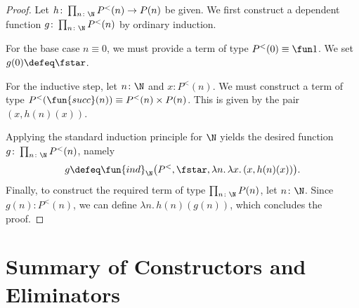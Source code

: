 \begin{proof}
    Let $h\colon\prod_{n\colon\N}P^<(n)\to P(n)$ be given. We first construct a dependent function $g\colon\prod_{n\colon\N}P^<(n)$ by ordinary induction.
    
    For the base case $n\equiv 0$, we must provide a term of type $P^<(0)\equiv\fun1$. We set $g(0)\defeq\fstar$.
    
    For the inductive step, let $n\colon\N$ and $x\colon P^<(n)$. We must construct a term of type $P^<(\fun{succ}(n))\equiv P^<(n)\times P(n)$. This is given by the pair $(x,h(n)(x))$. 
    
    Applying the standard induction principle for $\N$ yields the desired function $g\colon\prod_{n\colon\N} P^{<}(n)$, namely 
    \[
        g\defeq\fun{ind}_\N\bigl(
            P^<,
            \fstar,
            \lambda n.\,\lambda x.\,(x,h(n)(x))
        \bigr).
    \]
    Finally, to construct the required term of type $\prod_{n\colon\N}P(n)$, let $n\colon\N$. Since $g(n)\colon P^<(n)$, we can define $\lambda n.\,h(n)(g(n))$, which concludes the proof.
    
\end{proof}

\section{Summary of Constructors and Eliminators}

